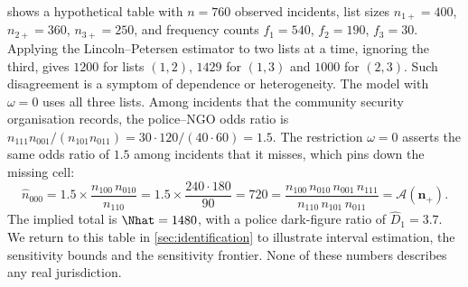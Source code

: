 \begin{example}\label{ex:fw-example}
 shows a hypothetical table with $n=760$ observed incidents, list sizes $n_{1+}=400$, $n_{2+}=360$, $n_{3+}=250$, and frequency counts $f_1=540$, $f_2=190$, $f_3=30$. Applying the Lincoln--Petersen estimator to two lists at a time, ignoring the third, gives $1200$ for lists $(1,2)$, $1429$ for $(1,3)$ and $1000$ for $(2,3)$. Such disagreement is a symptom of dependence or heterogeneity. The model with $\omega=0$ uses all three lists. Among incidents that the community security organisation records, the police--NGO odds ratio is $n_{111}n_{001}/(n_{101}n_{011})=30\cdot120/(40\cdot60)=1.5$. The restriction $\omega=0$ asserts the same odds ratio of $1.5$ among incidents that it misses, which pins down the missing cell:
\[
  \widehat n_{000}=1.5\times\frac{n_{100}\,n_{010}}{n_{110}}=1.5\times\frac{240\cdot180}{90}=720
  =\frac{n_{100}\,n_{010}\,n_{001}\,n_{111}}{n_{110}\,n_{101}\,n_{011}}=\mathcal A(\bm n_+).
\]
The implied total is $\Nhat=1480$, with a police dark-figure ratio of $\widehat D_1=3.7$. We return to this table in \cref{sec:identification} to illustrate interval estimation, the sensitivity bounds and the sensitivity frontier. None of these numbers describes any real jurisdiction.
\end{example}
